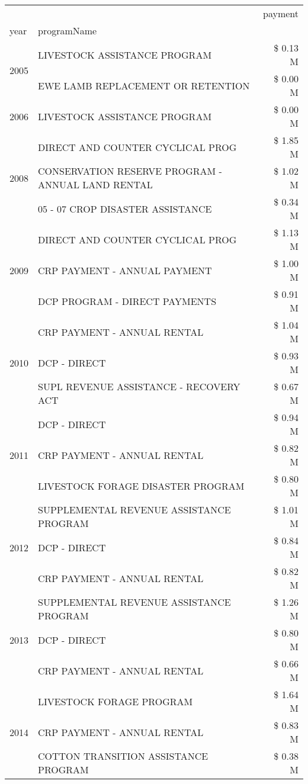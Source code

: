 \begin{tabular}{llr}
\toprule
 &  & payment \\
year & programName &  \\
\midrule
\multirow[t]{2}{*}{2005} & LIVESTOCK ASSISTANCE PROGRAM & \$ 0.13 M \\
 & EWE LAMB REPLACEMENT OR RETENTION & \$ 0.00 M \\
\cline{1-3}
2006 & LIVESTOCK ASSISTANCE PROGRAM & \$ 0.00 M \\
\cline{1-3}
\multirow[t]{3}{*}{2008} & DIRECT AND COUNTER CYCLICAL PROG & \$ 1.85 M \\
 & CONSERVATION RESERVE PROGRAM - ANNUAL LAND RENTAL & \$ 1.02 M \\
 & 05 - 07 CROP DISASTER ASSISTANCE & \$ 0.34 M \\
\cline{1-3}
\multirow[t]{3}{*}{2009} & DIRECT AND COUNTER CYCLICAL PROG & \$ 1.13 M \\
 & CRP PAYMENT - ANNUAL PAYMENT & \$ 1.00 M \\
 & DCP PROGRAM - DIRECT PAYMENTS & \$ 0.91 M \\
\cline{1-3}
\multirow[t]{3}{*}{2010} & CRP PAYMENT - ANNUAL RENTAL & \$ 1.04 M \\
 & DCP - DIRECT & \$ 0.93 M \\
 & SUPL REVENUE ASSISTANCE - RECOVERY ACT & \$ 0.67 M \\
\cline{1-3}
\multirow[t]{3}{*}{2011} & DCP - DIRECT & \$ 0.94 M \\
 & CRP PAYMENT - ANNUAL RENTAL & \$ 0.82 M \\
 & LIVESTOCK FORAGE DISASTER PROGRAM & \$ 0.80 M \\
\cline{1-3}
\multirow[t]{3}{*}{2012} & SUPPLEMENTAL REVENUE ASSISTANCE PROGRAM & \$ 1.01 M \\
 & DCP - DIRECT & \$ 0.84 M \\
 & CRP PAYMENT - ANNUAL RENTAL & \$ 0.82 M \\
\cline{1-3}
\multirow[t]{3}{*}{2013} & SUPPLEMENTAL REVENUE ASSISTANCE PROGRAM & \$ 1.26 M \\
 & DCP - DIRECT & \$ 0.80 M \\
 & CRP PAYMENT - ANNUAL RENTAL & \$ 0.66 M \\
\cline{1-3}
\multirow[t]{3}{*}{2014} & LIVESTOCK FORAGE PROGRAM & \$ 1.64 M \\
 & CRP PAYMENT - ANNUAL RENTAL & \$ 0.83 M \\
 & COTTON TRANSITION ASSISTANCE PROGRAM & \$ 0.38 M \\
\cline{1-3}

\end{tabular}
